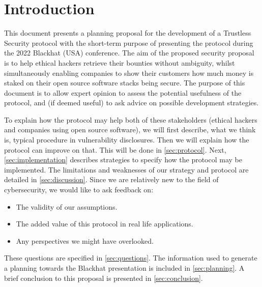 \section{Introduction}
\label{sec:introduction}
This document presents a planning proposal for the development of a Trustless Security protocol with the short-term purpose of presenting the protocol during the 2022 Blackhat (USA) conference. The aim of the proposed security proposal is to help ethical hackers retrieve their bounties without ambiguity, whilst simultaneously enabling companies to show their customers how much money is staked on their open source software stacks being secure. The purpose of this document is to allow expert opinion to assess the potential usefulness of the protocol, and (if deemed useful) to ask advice on possible development strategies.

To explain how the protocol may help both of these stakeholders (ethical hackers and companies using open source software), we will first describe, what we think is, typical procedure in vulnerability disclosures. Then we will explain how the protocol can improve on that. This will be done in \cref{sec:protocol}. Next, \cref{sec:implementation} describes strategies to specify how the protocol may be implemented. The limitations and weaknesses of our strategy and protocol are detailed in \cref{sec:discussion}. Since we are relatively new to the field of cybersecurity, we would like to ask feedback on:
\begin{itemize}
	\item The validity of our assumptions.
	\item The added value of this protocol in real life applications.
	\item Any perspectives we might have overlooked.
\end{itemize}
These questions are specified in \cref{sec:questions}. The information used to generate a planning towards the Blackhat presentation is included in \cref{sec:planning}. A brief conclusion to this proposal is presented in \cref{sec:conclusion}.